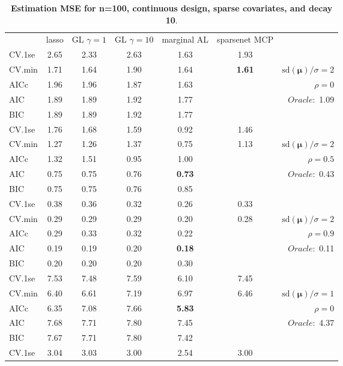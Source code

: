 \begin{table}\vspace{-.5cm}
\caption[l]{ { \bf Estimation MSE for n=100, continuous design, 
sparse covariates, and  decay  10}.}
\vspace{-.5cm}
\footnotesize{}
\begin{center}
\begin{tabular}{l*{5}{c}|r}
& lasso & GL $\gamma=1$ & GL $\gamma=10$ & marginal AL & sparsenet MCP  & \\
 \cline{1-7}
CV.1se & 2.65 & 2.33 & 2.63 & 1.63 & 1.93 & \\
CV.min & 1.71 & 1.64 & 1.90 & 1.64 & {\bf 1.61} &  $\mathrm{sd}(\mathbf{\mu})/\sigma=2$ \\
AICc & 1.96 & 1.96 & 1.87 & 1.63 & & $\rho=0$ \\
AIC & 1.89 & 1.89 & 1.92 & 1.77 & &  \multirow{2}{*}{$Oracle: $ 1.09} \\
BIC & 1.89 & 1.89 & 1.92 & 1.77 & &  \\
 \hline 
CV.1se & 1.76 & 1.68 & 1.59 & 0.92 & 1.46 & \\
CV.min & 1.27 & 1.26 & 1.37 & 0.75 & 1.13 &  $\mathrm{sd}(\mathbf{\mu})/\sigma=2$ \\
AICc & 1.32 & 1.51 & 0.95 & 1.00 & & $\rho=0.5$ \\
AIC & 0.75 & 0.75 & 0.76 & {\bf 0.73} & &  \multirow{2}{*}{$Oracle: $ 0.43} \\
BIC & 0.75 & 0.75 & 0.76 & 0.85 & &  \\
 \hline 
CV.1se & 0.38 & 0.36 & 0.32 & 0.26 & 0.33 & \\
CV.min & 0.29 & 0.29 & 0.29 & 0.20 & 0.28 &  $\mathrm{sd}(\mathbf{\mu})/\sigma=2$ \\
AICc & 0.29 & 0.33 & 0.32 & 0.22 & & $\rho=0.9$ \\
AIC & 0.19 & 0.19 & 0.20 & {\bf 0.18} & &  \multirow{2}{*}{$Oracle: $ 0.11} \\
BIC & 0.20 & 0.20 & 0.20 & 0.30 & &  \\
 \hline 
CV.1se & 7.53 & 7.48 & 7.59 & 6.10 & 7.45 & \\
CV.min & 6.40 & 6.61 & 7.19 & 6.97 & 6.46 &  $\mathrm{sd}(\mathbf{\mu})/\sigma=1$ \\
AICc & 6.35 & 7.08 & 7.66 & {\bf 5.83} & & $\rho=0$ \\
AIC & 7.68 & 7.71 & 7.80 & 7.45 & &  \multirow{2}{*}{$Oracle: $ 4.37} \\
BIC & 7.67 & 7.71 & 7.80 & 7.42 & &  \\
 \hline 
CV.1se & 3.04 & 3.03 & 3.00 & 2.54 & 3.00 & \\

\end{tabular}
\end{center}
\end{table}
